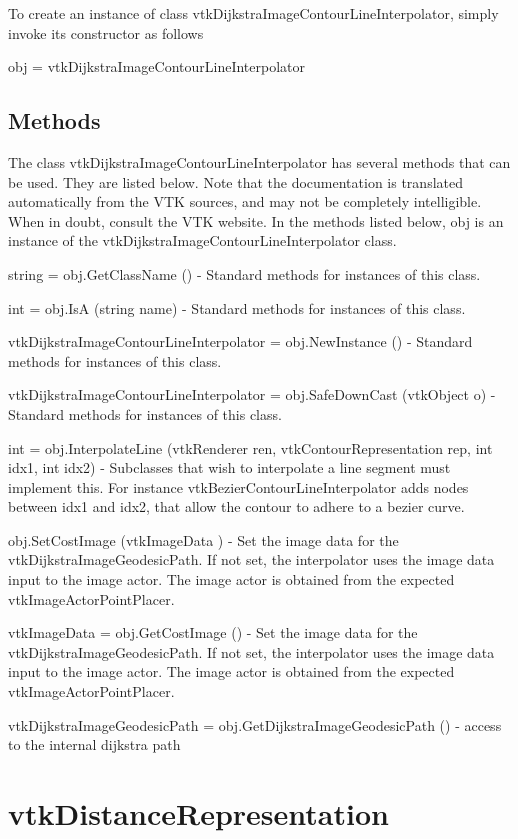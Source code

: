 To create an instance of class vtk\-Dijkstra\-Image\-Contour\-Line\-Interpolator, simply invoke its constructor as follows \begin{DoxyVerb}  obj = vtkDijkstraImageContourLineInterpolator
\end{DoxyVerb}
 \hypertarget{vtkwidgets_vtkxyplotwidget_Methods}{}\subsection{Methods}\label{vtkwidgets_vtkxyplotwidget_Methods}
The class vtk\-Dijkstra\-Image\-Contour\-Line\-Interpolator has several methods that can be used. They are listed below. Note that the documentation is translated automatically from the V\-T\-K sources, and may not be completely intelligible. When in doubt, consult the V\-T\-K website. In the methods listed below, {\ttfamily obj} is an instance of the vtk\-Dijkstra\-Image\-Contour\-Line\-Interpolator class. 
\begin{DoxyItemize}
\item {\ttfamily string = obj.\-Get\-Class\-Name ()} -\/ Standard methods for instances of this class.  
\item {\ttfamily int = obj.\-Is\-A (string name)} -\/ Standard methods for instances of this class.  
\item {\ttfamily vtk\-Dijkstra\-Image\-Contour\-Line\-Interpolator = obj.\-New\-Instance ()} -\/ Standard methods for instances of this class.  
\item {\ttfamily vtk\-Dijkstra\-Image\-Contour\-Line\-Interpolator = obj.\-Safe\-Down\-Cast (vtk\-Object o)} -\/ Standard methods for instances of this class.  
\item {\ttfamily int = obj.\-Interpolate\-Line (vtk\-Renderer ren, vtk\-Contour\-Representation rep, int idx1, int idx2)} -\/ Subclasses that wish to interpolate a line segment must implement this. For instance vtk\-Bezier\-Contour\-Line\-Interpolator adds nodes between idx1 and idx2, that allow the contour to adhere to a bezier curve.  
\item {\ttfamily obj.\-Set\-Cost\-Image (vtk\-Image\-Data )} -\/ Set the image data for the vtk\-Dijkstra\-Image\-Geodesic\-Path. If not set, the interpolator uses the image data input to the image actor. The image actor is obtained from the expected vtk\-Image\-Actor\-Point\-Placer.  
\item {\ttfamily vtk\-Image\-Data = obj.\-Get\-Cost\-Image ()} -\/ Set the image data for the vtk\-Dijkstra\-Image\-Geodesic\-Path. If not set, the interpolator uses the image data input to the image actor. The image actor is obtained from the expected vtk\-Image\-Actor\-Point\-Placer.  
\item {\ttfamily vtk\-Dijkstra\-Image\-Geodesic\-Path = obj.\-Get\-Dijkstra\-Image\-Geodesic\-Path ()} -\/ access to the internal dijkstra path  
\end{DoxyItemize}\hypertarget{vtkwidgets_vtkdistancerepresentation}{}\section{vtk\-Distance\-Representation}\label{vtkwidgets_vtkdistancerepresentation}
